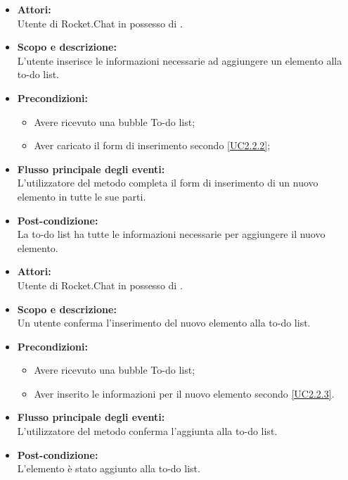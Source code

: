 
\begin{itemize}
	\item \textbf{Attori:}
	\\Utente di Rocket.Chat in possesso di \ProjectName{}.
	\item \textbf{Scopo e descrizione:} 
	\\L'utente inserisce le informazioni necessarie ad aggiungere un elemento alla to-do list.
	\item \textbf{Precondizioni:}
	\begin{itemize}
		\item Avere ricevuto una bubble To-do list;
		\item Aver caricato il form di inserimento secondo \ref{UC2.2.2};
	\end{itemize}
	\item \textbf{Flusso principale degli eventi:}
	\\L'utilizzatore del metodo completa il form di inserimento di un nuovo elemento in tutte le sue parti.
	\item \textbf{Post-condizione:}
	\\La to-do list ha tutte le informazioni necessarie per aggiungere il nuovo elemento.
\end{itemize}


\begin{itemize}
	\item \textbf{Attori:}
	\\Utente di Rocket.Chat in possesso di \ProjectName{}.
	\item \textbf{Scopo e descrizione:} 
	\\Un utente conferma l'inserimento del nuovo elemento alla to-do list.
	\item \textbf{Precondizioni:}
	\begin{itemize}
		\item Avere ricevuto una bubble To-do list;
		\item Aver inserito le informazioni per il nuovo elemento secondo \ref{UC2.2.3}.
	\end{itemize}
	\item \textbf{Flusso principale degli eventi:}
	\\L'utilizzatore del metodo conferma l'aggiunta alla to-do list.
	\item \textbf{Post-condizione:}
	\\L'elemento è stato aggiunto alla to-do list.
\end{itemize}

